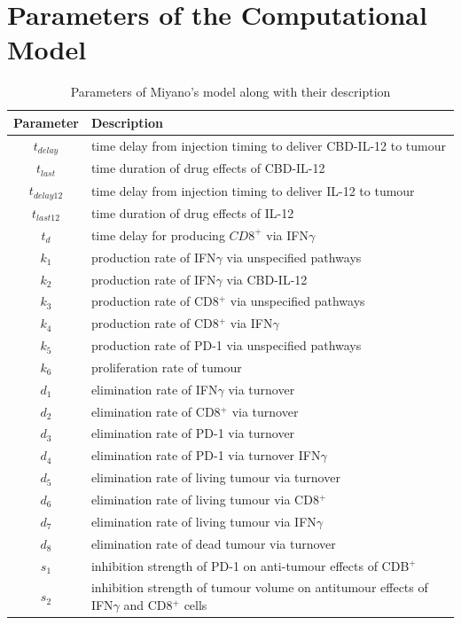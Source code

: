 \documentclass[11pt]{article}
\begin{document}
\clearpage
\newpage
\appendix
\section{Parameters of the Computational Model}\label{app}
\begin{table}[!h]
    \centering
    \caption{Parameters of Miyano's model along with their description}
    \begin{tabular}{c |l}
        \hline 
        Parameter & Description \\ \hline
        $t_{delay}$ & time delay from injection timing to deliver CBD-IL-12 to tumour \\ 
        $t_{last}$ & time duration of drug effects of CBD-IL-12 \\ 
        $t_{delay12}$ & time delay from injection timing to deliver IL-12 to tumour \\
        $t_{last12}$ & time duration of drug effects of IL-12 \\ 
        $t_d$ & time delay for producing $CD8^+$ via IFN$\gamma$ \\ \hdashline
        $k_1$ & production rate of IFN$\gamma$ via unspecified pathways \\ 
        $k_2$ & production rate of IFN$\gamma$ via CBD-IL-12 \\ 
        $k_3$ & production rate of CD8$^+$ via unspecified pathways \\ 
        $k_4$ & production rate of CD8$^+$ via IFN$\gamma$ \\ 
        $k_5$ & production rate of PD-1 via unspecified pathways \\ 
        $k_6$ & proliferation rate of tumour \\ \hdashline
        $d_1$ & elimination rate of IFN$\gamma$ via turnover \\
        $d_2$ & elimination rate of CD8$^+$ via turnover \\ 
        $d_3$ & elimination rate of PD-1 via turnover  \\ 
        $d_4$ & elimination rate of PD-1 via turnover IFN$\gamma$ \\ 
        $d_5$ & elimination rate of living tumour via turnover \\ 
        $d_6$ & elimination rate of living tumour via CD8$^+$ \\ 
        $d_7$ & elimination rate of living tumour via IFN$\gamma$ \\ 
        $d_8$ & elimination rate of dead tumour via turnover \\\hdashline
        $s_1$ & inhibition strength of PD-1 on anti-tumour effects of CDB$^+$ \\ 
        $s_2$ & inhibition strength of tumour volume on antitumour effects of IFN$\gamma$ and CD8$^+$ cells \\ \hline
    \end{tabular}
\end{table}

\clearpage
\newpage



\end{document}
